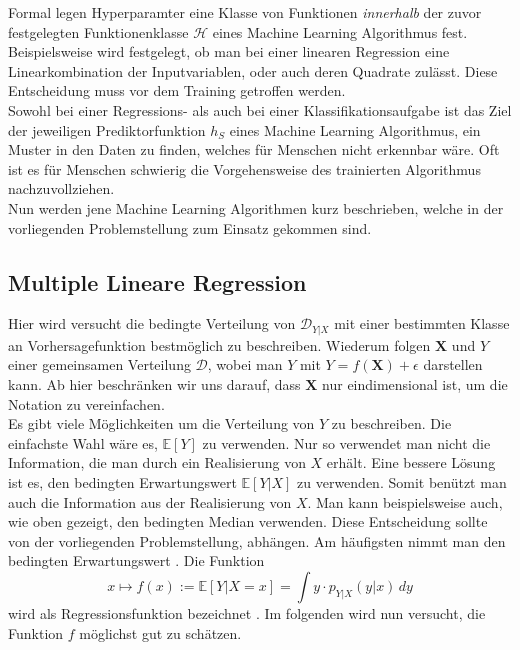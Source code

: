 Formal legen Hyperparamter eine Klasse von Funktionen \textit{innerhalb} der zuvor festgelegten Funktionenklasse $\mathcal{H}$ eines Machine 
Learning Algorithmus fest. Beispielsweise wird festgelegt, ob man bei einer linearen Regression eine Linearkombination der Inputvariablen, oder auch deren Quadrate 
zul\"asst. Diese Entscheidung muss vor dem Training getroffen werden. \\


Sowohl bei einer Regressions- als auch bei einer Klassifikationsaufgabe ist das Ziel der jeweiligen Prediktorfunktion $h_S$ eines Machine Learning Algorithmus, 
ein Muster in den Daten zu finden, welches f\"ur Menschen nicht erkennbar w\"are. Oft ist es f\"ur Menschen schwierig die Vorgehensweise des trainierten Algorithmus 
nachzuvollziehen. \\

Nun werden jene Machine Learning Algorithmen kurz beschrieben, welche in der vorliegenden Problemstellung zum Einsatz gekommen sind.





























\subsection{Multiple Lineare Regression}

Hier wird versucht die bedingte Verteilung von $\mathcal{D}_{Y|X}$ mit einer bestimmten Klasse an Vorhersagefunktion bestm\"oglich zu beschreiben. 
Wiederum folgen $\mathbf{X}$ und $Y$ einer gemeinsamen Verteilung $\mathcal{D}$, wobei man $Y$ mit $Y = f(\mathbf{X}) + \epsilon$ darstellen kann. 
Ab hier beschränken wir uns darauf, dass $\mathbf{X}$ nur eindimensional ist, um die Notation zu vereinfachen. \\

Es gibt viele M\"oglichkeiten um die Verteilung von $Y$ zu beschreiben. Die einfachste Wahl w\"are es, $\mathbb{E}[Y]$ zu verwenden. Nur so verwendet man nicht die 
Information, die man durch ein Realisierung von $X$ erh\"alt. Eine bessere L\"osung ist es, den bedingten Erwartungswert $\mathbb{E}[Y|X]$ zu verwenden. Somit ben\"utzt man auch die Information aus der 
Realisierung von $X$. Man kann beispielsweise auch, wie oben gezeigt, den bedingten Median verwenden. Diese Entscheidung sollte von der vorliegenden Problemstellung, 
abh\"angen. Am h\"aufigsten nimmt man den bedingten Erwartungswert \cite{bishop}. Die Funktion 
$$ x \mapsto f(x) := \mathbb{E}[Y|X = x] = \int y \cdot p_{Y|X}(y|x) \,dy $$
wird als Regressionsfunktion bezeichnet \cite{wasserman}. Im folgenden wird nun versucht, die Funktion $f$ m\"oglichst gut zu sch\"atzen.\\

